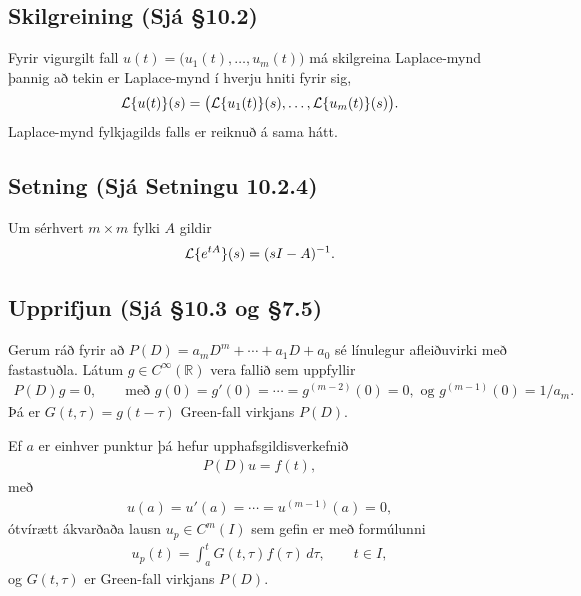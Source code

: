 \documentclass[a4paper,10pt,icelandic]{sphinxmanual}
\begin{document}
\subsection{Skilgreining (Sjá \S{}10.2)}
\label{\detokenize{Kafli10:skilgreining-sja-10-2}}
Fyrir vigurgilt fall \(u(t)=\big(u_1(t), \ldots, u_m(t)\big)\) má skilgreina Laplace-mynd þannig að tekin er Laplace-mynd í hverju hniti fyrir sig,
\begin{equation*}
\begin{split}{\cal L}\{u(t)\}(s)=\big({\cal L}\{u_1(t)\}(s), \ldots,{\cal L}\{u_m(t)\}(s)\big).\end{split}
\end{equation*}
Laplace-mynd fylkjagilds falls er reiknuð á sama hátt.


\subsection{Setning (Sjá Setningu 10.2.4)}
\label{\detokenize{Kafli10:setning-sja-setningu-10-2-4}}
Um sérhvert \(m\times m\) fylki \(A\) gildir
\begin{equation*}
\begin{split}{\cal L}\{e^{tA}\}(s) = (sI-A)^{-1}.\end{split}
\end{equation*}

\subsection{Upprifjun (Sjá \S{}10.3 og \S{}7.5)}
\label{\detokenize{Kafli10:upprifjun-sja-10-3-og-7-5}}
Gerum ráð fyrir að \(P(D)=a_mD^ m+\cdots+a_1D+a_0\) sé línulegur afleiðuvirki með fastastuðla. Látum \(g\in C^{\infty}(\mathbb{R})\) vera fallið sem uppfyllir
\begin{equation*}
\begin{split}P(D)g=0,\qquad \mbox{með }
g(0)=g'(0)=\cdots=g^{(m-2)}(0)=0,\mbox{ og }
g^{(m-1)}(0)=1/a_m.\end{split}
\end{equation*}
Þá er \(G(t,\tau)=g(t-\tau)\) Green-fall virkjans \(P(D)\).

Ef \(a\) er einhver punktur þá hefur upphafsgildisverkefnið
\begin{equation*}
\begin{split}P(D)u=f(t),\end{split}
\end{equation*}
með
\begin{equation*}
\begin{split}u(a)=u'(a)=\cdots=u^{(m-1)}(a)=0,\end{split}
\end{equation*}
ótvírætt ákvarðaða lausn \(u_p\in C^m(I)\) sem gefin er með
formúlunni
\begin{equation*}
\begin{split}u_p(t) = \int_a^ t G(t,\tau)f(\tau) \, d\tau, \qquad t\in I,\end{split}
\end{equation*}
og \(G(t,\tau)\) er Green-fall virkjans \(P(D)\).
\end{document}
